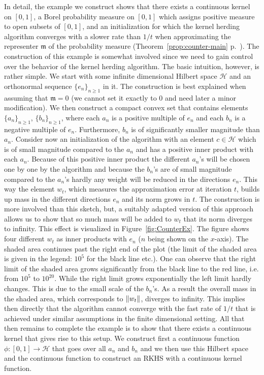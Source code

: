 \documentclass[10pt]{amsart}
\theoremstyle{definition}\newtheorem{defi}[theo]{Definition}\newtheorem{rema}[theo]{Remark}\newtheorem{exam}[theo]{Example}\newtheorem{exem}[theo]{Example}\newtheorem{nota}[theo]{Notation}
\theoremstyle{remark}
\newcommand{\cH}{\mathcal{H}}
\newcommand{\mean}{\mathfrak{m}}
\providecommand{\norm}[1]{\left\lVert#1\right\rVert}
\let\originalleft\left
\let\originalright\right
\renewcommand{\left}{\mathopen{}\mathclose\bgroup\originalleft}
\renewcommand{\right}{\aftergroup\egroup\originalright}
\begin{document}
In detail, the example we construct shows that there exists a continuous kernel on $[0,1]$, a Borel probability measure on $[0,1]$ which assigns positive measure to open subsets of $[0,1]$, and an initialization for which the kernel herding algorithm converges with a slower rate than $1/t$ when approximating the representer $\mean$ of the probability measure (Theorem~\ref{prop:counter-main} p.~\pageref{prop:counter-main}). The construction of this example is somewhat involved since we need to gain control over the behavior of the kernel herding algorithm. The basic intuition, however, is rather simple. We start with some infinite dimensional Hilbert space $\cH$ and an orthonormal sequence $\{e_n\}_{n\geq 1}$ in it. The construction is best explained when assuming that $\mean = 0 $ (we cannot set it exactly to $0$ and need later a minor modification). We then construct a compact convex set that contains elements $\{a_n\}_{n\geq 1}$, $\{b_n\}_{n\geq 1}$, where each $a_n$ is a positive multiple of $e_n$ and each $b_n$ is a negative multiple of $e_n$. Furthermore, $b_n$ is of significantly smaller magnitude than $a_n$. Consider now an initialization of the algorithm with an element $c \in \cH$ which is of small magnitude compared to the $a_n$ and has a positive inner product with each $a_n$. Because of this positive inner product the different $a_n$'s will be chosen one by one by the algorithm and because the $b_n$'s are of small magnitude compared to the $a_n$'s hardly any weight will be reduced in the directions $e_n$. This way the element $w_t$, which measures the approximation error at iteration $t$, builds up mass in the different directions $e_n$ and its norm grows in $t$. The construction is more involved than this sketch, but, a suitably adapted version of this approach allows us to show that so much mass will be added to $w_t$ that its norm diverges to infinity. This effect is visualized in Figure~\ref{fig:CounterEx}. The figure shows four different $w_t$ as inner products with $e_n$ ($n$ being shown on the $x$-axis). The shaded area continues past the right end of the plot (the limit of the shaded area is given in the legend: $10^5$ for the black line etc.). One can observe that the right limit of the shaded area grows significantly from the black line to the red line, i.e. from $10^5$ to $10^{20}$. While the right limit grows exponentially the left limit hardly changes. This is due to the small scale of the $b_n$'s. As a result the overall mass in the shaded area, which corresponds to $\norm{w_t}$, diverges to infinity. This implies then directly that the algorithm cannot converge with the fast rate of $1/t$ that is achieved under similar assumptions in the finite dimensional setting. All that then remains to complete the example is to show that there exists a continuous kernel that gives rise to this setup. We construct first a continuous function $\phi:[0,1] \rightarrow \cH$ that goes over all $a_n$ and $b_n$ and we then use this Hilbert space and the continuous function to construct an RKHS with a continuous kernel function.
\end{document}
